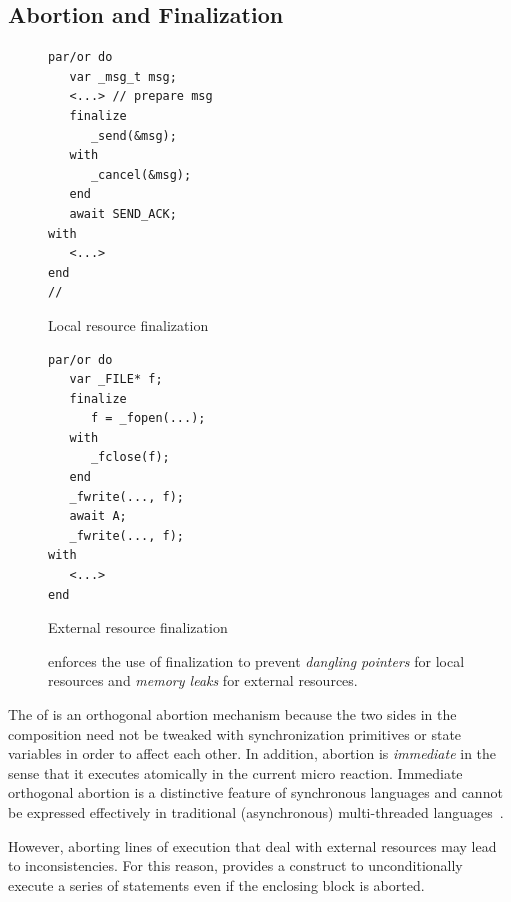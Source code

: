 \subsection{Abortion and Finalization}
\label{sec.ceu.fin}

\begin{figure}
\begin{minipage}[t]{0.45\linewidth}
\begin{lstlisting}[numbers=right]
par/or do
   var _msg_t msg;
   <...> // prepare msg
   finalize
      _send(&msg);
   with
      _cancel(&msg);
   end
   await SEND_ACK;
with
   <...>
end
//
\end{lstlisting}
\centering\small{\ax Local resource finalization}
\end{minipage}
%
\begin{minipage}[t]{0.53\linewidth}
\begin{lstlisting}[xleftmargin=2em]
par/or do
   var _FILE* f;
   finalize
      f = _fopen(...);
   with
      _fclose(f);
   end
   _fwrite(..., f);
   await A;
   _fwrite(..., f);
with
   <...>
end
\end{lstlisting}
\centering\small{\bx External resource finalization}
\end{minipage}
\caption{
\CEU enforces the use of finalization to prevent \emph{dangling pointers} for
local resources and \emph{memory leaks} for external resources.
\label{lst.fin.ceu}
}
\end{figure}

The  of \CEU is an orthogonal abortion mechanism because the two
sides in the composition need not be tweaked with synchronization primitives or
state variables in order to affect each other.
%
In addition, abortion is \emph{immediate} in the sense that it executes
atomically in the current micro reaction.
%
Immediate orthogonal abortion is a distinctive feature of synchronous languages
and cannot be expressed effectively in traditional (asynchronous)
multi-threaded languages~\cite{esterel.preemption,sync_async.threadsstop}.

However, aborting lines of execution that deal with external resources may lead
to inconsistencies.
%
For this reason, \CEU provides a  construct to unconditionally
execute a series of statements even if the enclosing block is aborted.

